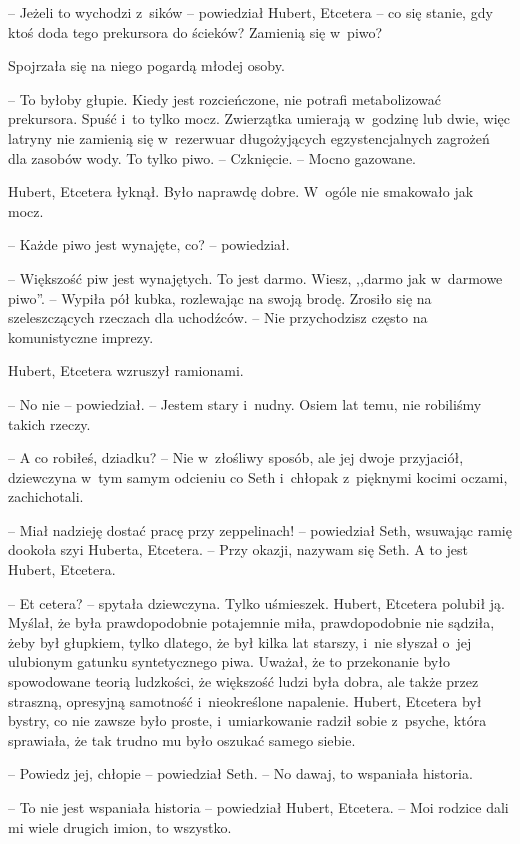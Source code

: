 \documentclass[oneside,polish,11pt,sfheadings]{mwbk}
\begin{document}
-- Jeżeli to wychodzi z~sików -- powiedział Hubert, Etcetera -- co się
stanie, gdy ktoś doda tego prekursora do ścieków? Zamienią się w~piwo?

Spojrzała się na niego pogardą młodej osoby. 

-- To byłoby głupie. Kiedy jest rozcieńczone, nie potrafi metabolizować prekursora. Spuść i~to
tylko mocz. Zwierzątka umierają w~godzinę lub dwie, więc latryny nie
zamienią się w~rezerwuar długożyjących egzystencjalnych zagrożeń dla
zasobów wody. To tylko piwo. -- Czknięcie. -- Mocno gazowane.

Hubert, Etcetera łyknął. Było naprawdę dobre. W~ogóle nie smakowało jak
mocz. 

-- Każde piwo jest wynajęte, co? -- powiedział.

-- Większość piw jest wynajętych. To jest darmo. Wiesz, ,,darmo jak w~darmowe piwo''. -- Wypiła pół kubka, rozlewając na swoją brodę. Zrosiło
się na szeleszczących rzeczach dla uchodźców. -- Nie przychodzisz często
na komunistyczne imprezy.

Hubert, Etcetera wzruszył ramionami. 

-- No nie -- powiedział. -- Jestem
stary i~nudny. Osiem lat temu, nie robiliśmy takich rzeczy.

-- A co robiłeś, dziadku? -- Nie w~złośliwy sposób, ale jej dwoje
przyjaciół, dziewczyna w~tym samym odcieniu co Seth i~chłopak z~pięknymi
kocimi oczami, zachichotali.

-- Miał nadzieję dostać pracę przy zeppelinach! -- powiedział Seth,
wsuwając ramię dookoła szyi Huberta, Etcetera. -- Przy okazji, nazywam
się Seth. A to jest Hubert, Etcetera.

-- Et cetera? -- spytała dziewczyna. Tylko uśmieszek. Hubert, Etcetera
polubił ją. Myślał, że była prawdopodobnie potajemnie miła,
prawdopodobnie nie sądziła, żeby był głupkiem, tylko dlatego, że był
kilka lat starszy, i~nie słyszał o~jej ulubionym gatunku syntetycznego
piwa. Uważał, że to przekonanie było spowodowane teorią ludzkości, że
większość ludzi była dobra, ale także przez straszną, opresyjną
samotność i~nieokreślone napalenie. Hubert, Etcetera był bystry, co nie
zawsze było proste, i~umiarkowanie radził sobie z~psyche, która
sprawiała, że tak trudno mu było oszukać samego siebie.

-- Powiedz jej, chłopie -- powiedział Seth. -- No dawaj, to wspaniała
historia.

-- To nie jest wspaniała historia -- powiedział Hubert, Etcetera. -- Moi
rodzice dali mi wiele drugich imion, to wszystko.
\end{document}
